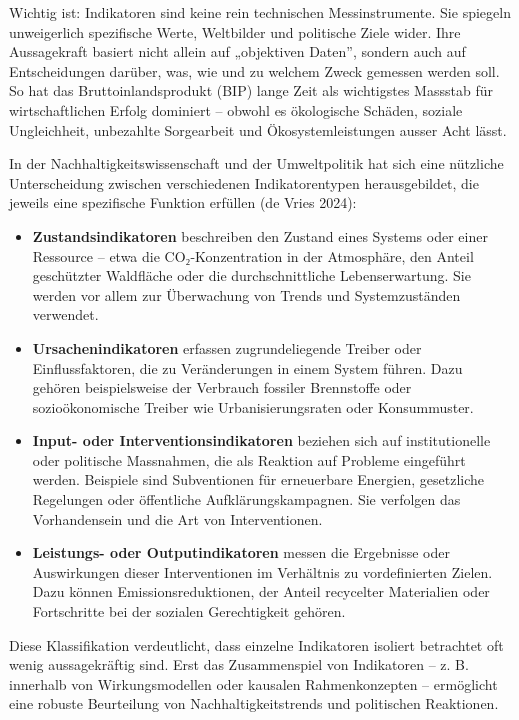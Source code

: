 \documentclass[
  nswissgerman,
  a4paper,
  openany]{book}
\begin{document}
Wichtig ist: Indikatoren sind keine rein technischen Messinstrumente.
Sie spiegeln unweigerlich spezifische Werte, Weltbilder und politische
Ziele wider. Ihre Aussagekraft basiert nicht allein auf „objektiven
Daten'', sondern auch auf Entscheidungen darüber, was, wie und zu
welchem Zweck gemessen werden soll. So hat das Bruttoinlandsprodukt
(BIP) lange Zeit als wichtigstes Massstab für wirtschaftlichen Erfolg
dominiert -- obwohl es ökologische Schäden, soziale Ungleichheit,
unbezahlte Sorgearbeit und Ökosystemleistungen ausser Acht lässt.

In der Nachhaltigkeitswissenschaft und der Umweltpolitik hat sich eine
nützliche Unterscheidung zwischen verschiedenen Indikatorentypen
herausgebildet, die jeweils eine spezifische Funktion erfüllen ({de
Vries} 2024):

\begin{itemize}
\item
  \textbf{Zustandsindikatoren} beschreiben den Zustand eines Systems
  oder einer Ressource -- etwa die CO₂-Konzentration in der Atmosphäre,
  den Anteil geschützter Waldfläche oder die durchschnittliche
  Lebenserwartung. Sie werden vor allem zur Überwachung von Trends und
  Systemzuständen verwendet.
\item
  \textbf{Ursachenindikatoren} erfassen zugrundeliegende Treiber oder
  Einflussfaktoren, die zu Veränderungen in einem System führen. Dazu
  gehören beispielsweise der Verbrauch fossiler Brennstoffe oder
  sozioökonomische Treiber wie Urbanisierungsraten oder Konsummuster.
\item
  \textbf{Input- oder Interventionsindikatoren} beziehen sich auf
  institutionelle oder politische Massnahmen, die als Reaktion auf
  Probleme eingeführt werden. Beispiele sind Subventionen für
  erneuerbare Energien, gesetzliche Regelungen oder öffentliche
  Aufklärungskampagnen. Sie verfolgen das Vorhandensein und die Art von
  Interventionen.
\item
  \textbf{Leistungs- oder Outputindikatoren} messen die Ergebnisse oder
  Auswirkungen dieser Interventionen im Verhältnis zu vordefinierten
  Zielen. Dazu können Emissionsreduktionen, der Anteil recycelter
  Materialien oder Fortschritte bei der sozialen Gerechtigkeit gehören.
\end{itemize}

Diese Klassifikation verdeutlicht, dass einzelne Indikatoren isoliert
betrachtet oft wenig aussagekräftig sind. Erst das Zusammenspiel von
Indikatoren -- z. B. innerhalb von Wirkungsmodellen oder kausalen
Rahmenkonzepten -- ermöglicht eine robuste Beurteilung von
Nachhaltigkeitstrends und politischen Reaktionen.
\end{document}
